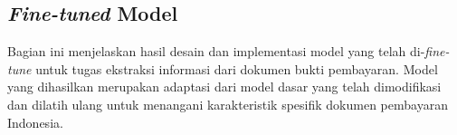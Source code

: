 \subsection{\emph{Fine-tuned} \donut{} Model}
\label{subsec:fine-tuned-model}

Bagian ini menjelaskan hasil desain dan implementasi model \donut{} yang telah di-\emph{fine-tune} untuk tugas ekstraksi informasi dari dokumen bukti pembayaran. Model yang dihasilkan merupakan adaptasi dari model dasar \donutcord{} yang telah dimodifikasi dan dilatih ulang untuk menangani karakteristik spesifik dokumen pembayaran Indonesia.

